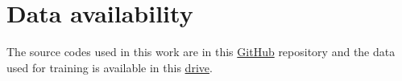 \documentclass[preprint,12pt]{elsarticle}
\begin{document}
\section*{Data availability}
The source codes used in this work are in this \href{https://github.com/suryaroboticarm/Differential-Inverse-Kinematics-with-Coupled-Reward-Design}{GitHub} repository and the data used for training is available in this \href{https://drive.google.com/file/d/1BO6DrKE7GO-1D8vohWwWejpfg7DyryN8/view?usp=sharing}{drive}.









\end{document}
